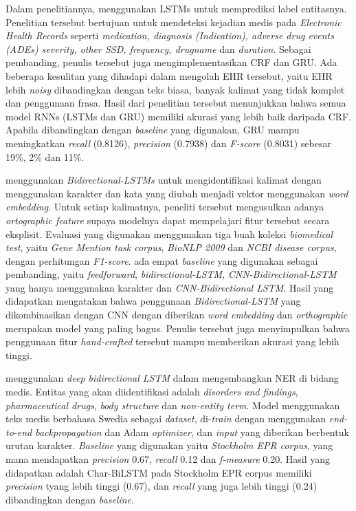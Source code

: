 Dalam penelitiannya, \cite{jagannatha2016bidirectional} menggunakan LSTMs untuk memprediksi label entitasnya. Penelitian tersebut bertujuan untuk mendeteksi kejadian medis pada \textit{Electronic Health Records} seperti \textit{ medication, diagnosis (Indication), adverse drug events (ADEs) severity, other SSD, frequency, drugname} dan \textit{duration}. Sebagai pembanding, penulis tersebut juga mengimplementasikan CRF dan GRU. Ada beberapa kesulitan yang dihadapi dalam mengolah EHR tersebut, yaitu EHR lebih \textit{noisy} dibandingkan dengan teks biasa, banyak kalimat yang tidak komplet dan penggunaan frasa. Hasil dari penelitian tersebut menunjukkan bahwa semua model RNNs (LSTMs dan GRU) memiliki akurasi yang lebih baik daripada CRF. Apabila dibandingkan dengan \textit{baseline} yang digunakan, GRU mampu meningkatkan \textit{recall} (0.8126), \textit{precision} (0.7938) dan \textit{F-score} (0.8031) sebesar 19\%, 2\% dan 11\%.

\cite{limsopatham2016learning} menggunakan \textit{Bidirectional-LSTMs} untuk mengidentifikasi kalimat dengan menggunakan karakter dan kata yang diubah menjadi vektor menggunakan \textit{word embedding}. Untuk setiap kalimatnya, peneliti tersebut mengusulkan adanya \textit{ortographic feature} supaya modelnya dapat mempelajari fitur tersebut secara eksplisit. Evaluasi yang digunakan menggunakan tiga buah koleksi \textit{biomedical test}, yaitu \textit{Gene Mention task corpus}, \textit{BioNLP 2009} dan \textit{NCBI disease corpus}, dengan perhitungan \textit{F1-score}. ada empat \textit{baseline} yang digunakan sebagai pembanding, yaitu \textit{feedforward}, \textit{bidirectional-LSTM}, \textit{CNN-Bidirectional-LSTM} yang hanya menggunakan karakter dan \textit{CNN-Bidirectional LSTM}. Hasil yang didapatkan mengatakan bahwa penggunaan \textit{Bidirectional-LSTM} yang dikombinasikan dengan CNN dengan diberikan \textit{word embedding} dan \textit{orthographic} merupakan model yang paling bagus. Penulis tersebut juga menyimpulkan bahwa penggunaan fitur \textit{hand-crafted} tersebut mampu memberikan akurasi yang lebih tinggi.

\cite{almgren2016named} menggunakan \textit{deep bidirectional LSTM} dalam mengembangkan NER di bidang medis. Entitas yang akan diidentifikasi adalah \textit{disorders and findings}, \textit{pharmaceutical drugs}, \textit{body structure} dan \textit{non-entity term}. Model menggunakan teks medis berbahasa Swedia sebagai \textit{dataset}, di-\textit{train} dengan menggunakan \textit{end-to-end backpropagation} dan Adam \textit{optimizer}, dan \textit{input} yang diberikan berbentuk urutan karakter. \textit{Baseline} yang digunakan yaitu \textit{Stockholm EPR corpus}, yang mana mendapatkan \textit{precision} 0.67, \textit{recall} 0.12 dan \textit{f-measure} 0.20. Hasil yang didapatkan adalah Char-BiLSTM pada Stockholm EPR corpus memiliki \textit{precision} tyang lebih tinggi (0.67), dan \textit{recall} yang juga lebih tinggi (0.24) dibandingkan dengan \textit{baseline}.

